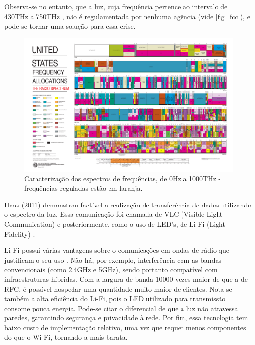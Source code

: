 	Observa-se no entanto, que a luz, cuja frequência pertence ao intervalo de 430THz a 750THz \cite{vision},  não é regulamentada por nenhuma agência (vide \autoref{fig_fcc}), e pode se tornar uma solução para essa crise.

	\begin{figure}[h!]
		\caption{\label{fig_fcc}Caracterização dos espectros de frequências, de 0Hz a 1000THz - frequências reguladas estão em laranja.}
		\begin{center}
		\includegraphics[width=\textwidth, trim={36.5cm 3.1cm 40cm 61cm},clip]{2003-allochrt.pdf}	
		\end{center}
	\end{figure}
	
	Haas (2011) demonstrou factível a realização de transferência de dados utilizando o espectro da luz. Essa comunicação foi chamada de VLC (Visible Light Communication) e posteriormente, como o uso de LED's, de Li-Fi (Light Fidelity) \cite{what-is-lifi}. \par 
	
	Li-Fi possui várias vantagens sobre o comunicações em ondas de rádio que justificam o seu uso \cite{comparison-wifi}. Não há, por exemplo, interferência com as bandas convencionais (como 2.4GHz e 5GHz), sendo portanto compatível com infraestruturas híbridas. Com a largura de banda 10000 vezes maior do que a de RFC, é possível hospedar uma quantidade muito maior de clientes. Nota-se também a alta eficiência do Li-Fi, pois o LED utilizado para transmissão consome pouca energia. Pode-se citar o diferencial de que a luz não atravessa paredes, garantindo segurança e privacidade à rede. Por fim, essa tecnologia tem baixo custo de implementação relativo, uma vez que requer menos componentes do que o Wi-Fi, tornando-a mais barata. \par
	
